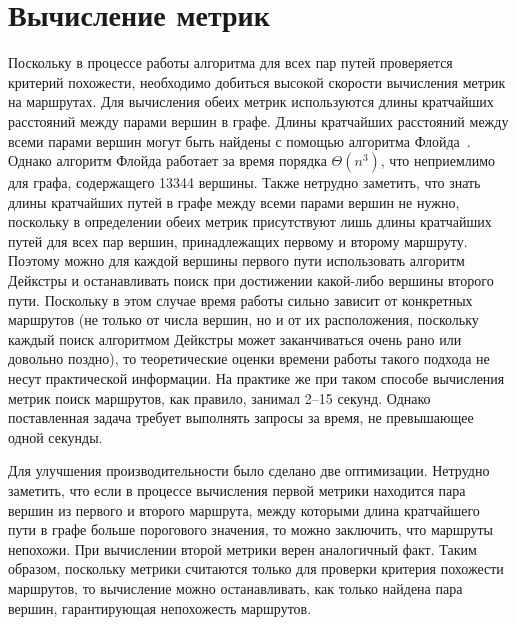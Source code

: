 \FloatBarrier

\section{Вычисление метрик}

Поскольку в процессе работы алгоритма для всех пар путей проверяется
критерий похожести, необходимо добиться высокой скорости вычисления
метрик на маршрутах. Для вычисления обеих метрик используются длины
кратчайших расстояний между парами вершин в графе. Длины кратчайших
расстояний между всеми парами вершин могут быть найдены с помощью
алгоритма Флойда~\cite{floyd1962algorithm}. Однако алгоритм Флойда
работает за время порядка $\Theta(n^3)$, что неприемлимо для графа,
содержащего 13344 вершины. Также нетрудно заметить, что знать длины
кратчайших путей в графе между всеми парами вершин не нужно, поскольку
в определении обеих метрик присутствуют лишь длины кратчайших путей
для всех пар вершин, принадлежащих первому и второму маршруту. Поэтому
можно для каждой вершины первого пути использовать алгоритм Дейкстры и
останавливать поиск при достижении какой-либо вершины второго пути.
Поскольку в этом случае время работы сильно зависит от конкретных
маршрутов (не только от числа вершин, но и от их расположения,
поскольку каждый поиск алгоритмом Дейкстры может заканчиваться очень
рано или довольно поздно), то теоретические оценки времени работы
такого подхода не несут практической информации. На практике же при
таком способе вычисления метрик поиск маршрутов, как правило, занимал
2--15 секунд. Однако поставленная задача требует выполнять запросы за
время, не превышающее одной секунды.

Для улучшения производительности было сделано две оптимизации.
Нетрудно заметить, что если в процессе вычисления первой метрики
находится пара вершин из первого и второго маршрута, между которыми
длина кратчайшего пути в графе больше порогового значения, то можно
заключить, что маршруты непохожи. При вычислении второй метрики верен
аналогичный факт. Таким образом, поскольку метрики считаются только
для проверки критерия похожести маршрутов, то вычисление можно
останавливать, как только найдена пара вершин, гарантирующая
непохожесть маршрутов.

